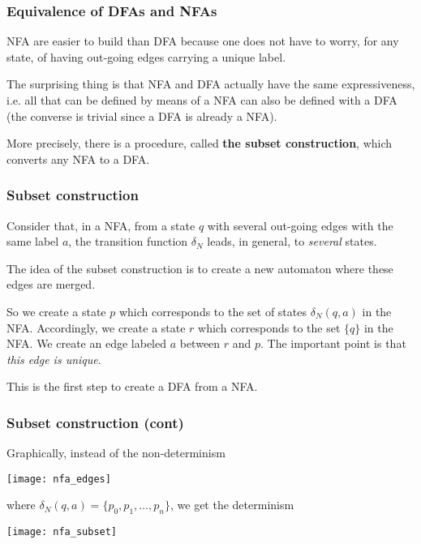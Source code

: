 
% 
\begin{frame}
\frametitle{Equivalence of DFAs and NFAs}

NFA are easier to build than DFA because one does not have to worry,
for any state, of having out-going edges carrying a unique label.

\bigskip

The surprising thing is that NFA and DFA actually have the same
expressiveness, i.e. all that can be defined by means of a NFA can
also be defined with a DFA (the converse is trivial since a DFA is
already a NFA).

\bigskip

More precisely, there is a procedure, called \textbf{the subset
construction}, which converts any NFA to a DFA.

\end{frame}

% 
\begin{frame}
\frametitle{Subset construction}

Consider that, in a NFA, from a state \(q\) with several out-going
edges with the same label \(a\), the transition function \(\delta_N\)
leads, in general, to \emph{several} states.

\bigskip

The idea of the subset construction is to create a new automaton where
these edges are merged. 

\bigskip

So we create a state \(p\) which corresponds to the set of states
\(\delta_N (q,a)\) in the NFA. Accordingly, we create a state \(r\)
which corresponds to the set \(\{q\}\) in the NFA. We create an edge
labeled \(a\) between \(r\) and \(p\). The important point is that
\emph{this edge is unique}.

\bigskip

This is the first step to create a DFA from a NFA.

\end{frame}


% 
\begin{frame}
\frametitle{Subset construction (cont)}

Graphically, instead of the non-determinism
\begin{center}
\texttt{[image: nfa\_edges]}
\end{center}
where \(\delta_N (q, a) = \{p_0, p_1, \dots, p_n\}\), we get the
determinism
\begin{center}
\texttt{[image: nfa\_subset]}
\end{center}

\end{frame}

